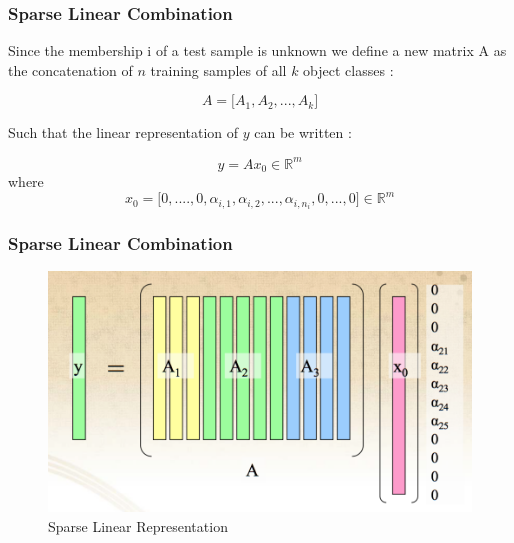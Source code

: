 \documentclass{beamer}
\begin{document}
		\begin{frame}
		\frametitle{Sparse Linear Combination}

Since the membership i of a test sample is unknown we define a new matrix A as the concatenation of $n$ training samples of all $k$ object classes :

$$A=\lbrack A_{1},A_{2},...,A_{k} \rbrack $$

Such that the linear representation of $y$ can be written :

$$y=Ax_{0}  \in \mathbb{R}^{m} $$
where 
$$x_{0}=\lbrack 0,....,0,\alpha_{i,1},\alpha_{i,2},...,\alpha_{i,n_{i}},0,...,0  \rbrack \in \mathbb{R}^{m}$$


		\end{frame}

		
\begin{frame}

		\frametitle{Sparse Linear Combination}		
			
			\begin{figure}[!ht]
			\begin{center}
			\includegraphics[scale=0.5]{sparse.png}
			\end{center}
			\caption{Sparse Linear Representation}
			\label{ma}
			\end{figure}

\end{frame}

		
\end{document}

